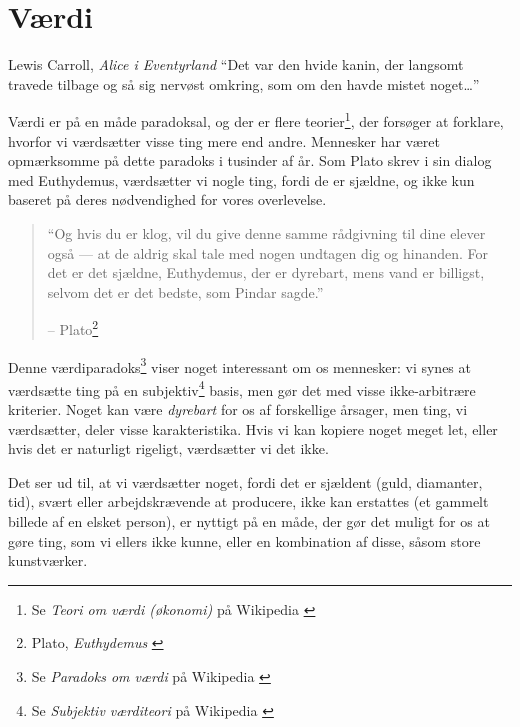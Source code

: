 \chapter{Værdi}
\label{les:10}

\begin{chapquote}{Lewis Carroll, \textit{Alice i Eventyrland}}
\enquote{Det var den hvide kanin, der langsomt travede tilbage og så sig 
nervøst omkring, som om den havde mistet noget\ldots}
\end{chapquote}

Værdi er på en måde paradoksal, og der er flere teorier\footnote{Se 
\textit{Teori om værdi (økonomi)} på Wikipedia \cite{wiki:theory-of-value}}, 
der forsøger at forklare, hvorfor vi værdsætter visse ting mere end andre.
Mennesker har været opmærksomme på dette paradoks i tusinder af år. Som Plato 
skrev i sin dialog med Euthydemus, værdsætter vi nogle ting, fordi de er 
sjældne, og ikke kun baseret på deres nødvendighed for vores overlevelse.

\begin{quotation}\begin{samepage}
\enquote{Og hvis du er klog, vil du give denne samme rådgivning til dine 
elever også --- at de aldrig skal tale med nogen undtagen dig og hinanden. 
For det er det sjældne, Euthydemus, der er dyrebart, mens vand er billigst, 
selvom det er det bedste, som Pindar sagde.}
\begin{flushright} -- Plato\footnote{Plato, 
    \textit{Euthydemus} \cite{euthydemus}}
\end{flushright}\end{samepage}\end{quotation}

Denne værdiparadoks\footnote{Se \textit{Paradoks om værdi} på Wikipedia
\cite{wiki:paradox-of-value}} viser noget interessant om os mennesker: vi synes 
at værdsætte ting på en subjektiv\footnote{Se \textit{Subjektiv værditeori} på 
Wikipedia \cite{wiki:subjective-theory-of-value}} basis, men gør det med visse 
ikke-arbitrære kriterier. Noget kan være \textit{dyrebart} for os af 
forskellige årsager, men ting, vi værdsætter, deler visse karakteristika. Hvis 
vi kan kopiere noget meget let, eller hvis det er naturligt rigeligt, 
værdsætter vi det ikke.

Det ser ud til, at vi værdsætter noget, fordi det er sjældent (guld, 
diamanter, tid), svært eller arbejdskrævende at producere, ikke kan 
erstattes (et gammelt billede af en elsket person), er nyttigt på en måde, der 
gør det muligt for os at gøre ting, som vi ellers ikke kunne, eller en 
kombination af disse, såsom store kunstværker.

